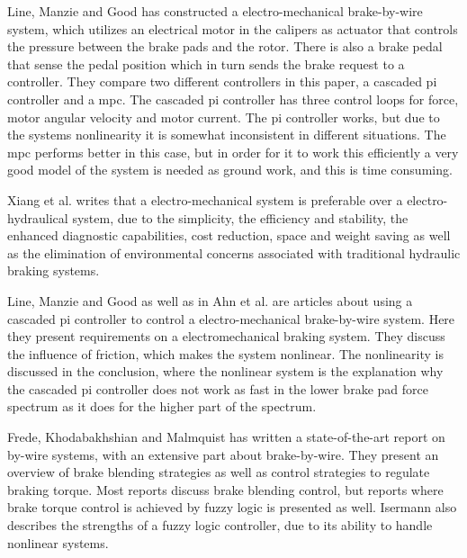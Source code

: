 \documentclass[a4paper,11pt]{kth-mag}
\begin{document}
\vspace{5mm}
Line, Manzie and Good \cite{4475522} has constructed a electro-mechanical  brake-by-wire system, which utilizes an electrical motor in the calipers as actuator that controls the pressure between the brake pads and the rotor. There is also a brake pedal that sense the pedal position which in turn sends the brake request to a controller. They compare two different controllers in this paper, a cascaded \gls{pi} controller and a \gls{mpc}. The cascaded \gls{pi} controller has three control loops for force, motor angular velocity and motor current. The \gls{pi} controller works, but due to the systems nonlinearity it is somewhat inconsistent in different situations. The \gls{mpc} performs better in this case, but in order for it to work this efficiently a very good model of the system is needed as ground work, and this is time consuming. \newline


Xiang et al. \cite{Xiang} writes that a electro-mechanical system is preferable over a electro-hydraulical system, due to the simplicity, the efficiency and stability, the enhanced diagnostic capabilities, cost reduction, space and weight saving as well as the elimination of environmental concerns associated with traditional hydraulic braking systems.\newline

Line, Manzie and Good \cite{2004-01-2050} as well as in Ahn et al. \cite{ahn2009analysis} are articles about using a cascaded \gls{pi} controller to control a electro-mechanical brake-by-wire system. Here they present requirements on a electromechanical braking system. They discuss the influence of friction, which makes the system nonlinear. The nonlinearity is discussed in the conclusion, where the nonlinear system is the explanation why the cascaded pi controller does not work as fast in the lower brake pad force spectrum as it does for the higher part of the spectrum. \newline



Frede, Khodabakhshian and Malmquist \cite{Frede460614} has written a state-of-the-art report on by-wire systems, with an extensive part about brake-by-wire. They present an overview of brake blending strategies as well as control strategies to regulate braking torque. Most reports discuss brake blending control, but reports where  brake torque control is achieved by fuzzy logic is presented as well. Isermann \cite{661149} also describes the strengths of a fuzzy logic controller, due to its ability to handle nonlinear systems. \newline
\end{document}
